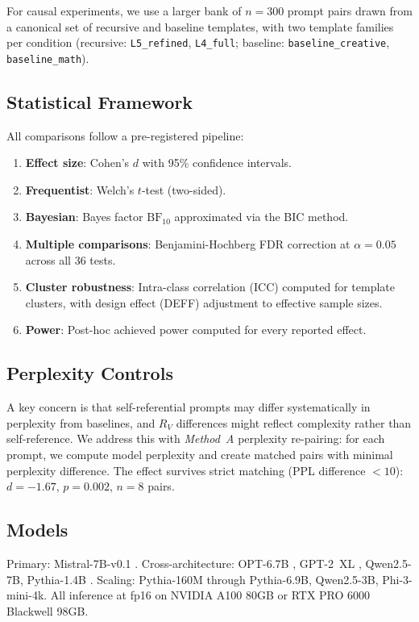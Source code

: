 \documentclass{article}
\newcommand{\RV}{R_V}
\newcommand{\dcohen}{d}
\begin{document}
For causal experiments, we use a larger bank of $n{=}300$ prompt pairs drawn from a canonical set of recursive and baseline templates, with two template families per condition (recursive: \texttt{L5\_refined}, \texttt{L4\_full}; baseline: \texttt{baseline\_creative}, \texttt{baseline\_math}).

\subsection{Statistical Framework}
\label{sec:stats}

All comparisons follow a pre-registered pipeline:
\begin{enumerate}
    \item \textbf{Effect size}: Cohen's $\dcohen$ with 95\% confidence intervals.
    \item \textbf{Frequentist}: Welch's $t$-test (two-sided).
    \item \textbf{Bayesian}: Bayes factor $\text{BF}_{10}$ approximated via the BIC method.
    \item \textbf{Multiple comparisons}: Benjamini-Hochberg FDR correction at $\alpha{=}0.05$ across all 36 tests.
    \item \textbf{Cluster robustness}: Intra-class correlation (ICC) computed for template clusters, with design effect (DEFF) adjustment to effective sample sizes.
    \item \textbf{Power}: Post-hoc achieved power computed for every reported effect.
\end{enumerate}

\subsection{Perplexity Controls}

A key concern is that self-referential prompts may differ systematically in perplexity from baselines, and $\RV$ differences might reflect complexity rather than self-reference.
We address this with \emph{Method~A} perplexity re-pairing: for each prompt, we compute model perplexity and create matched pairs with minimal perplexity difference.
The effect survives strict matching (PPL difference $< 10$): $\dcohen{=}{-}1.67$, $p{=}0.002$, $n{=}8$ pairs.

\subsection{Models}

Primary: Mistral-7B-v0.1 \citep{jiang2023mistral}.
Cross-architecture: OPT-6.7B \citep{zhang2022opt}, GPT-2~XL \citep{radford2019language}, Qwen2.5-7B, Pythia-1.4B \citep{biderman2023pythia}.
Scaling: Pythia-160M through Pythia-6.9B, Qwen2.5-3B, Phi-3-mini-4k.
All inference at fp16 on NVIDIA A100 80GB or RTX PRO 6000 Blackwell 98GB.
\end{document}
